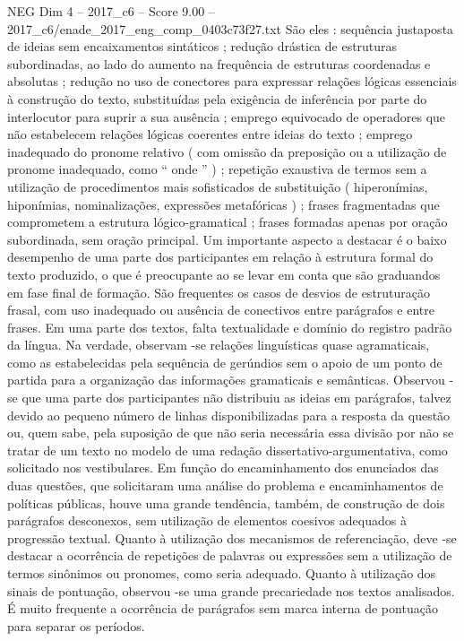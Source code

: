 \begin{textsample}{NEG Dim 4 – 2017\_c6 – Score 9.00 – 2017\_c6/enade\_2017\_eng\_comp\_0403c73f27.txt}
São eles : sequência justaposta de ideias sem encaixamentos sintáticos ; redução drástica de estruturas subordinadas, ao lado do aumento na frequência de estruturas coordenadas e absolutas ; redução no uso de conectores para expressar relações lógicas essenciais à construção do texto, substituídas pela exigência de inferência por parte do interlocutor para suprir a sua ausência ; emprego equivocado de operadores que não estabelecem relações lógicas coerentes entre ideias do texto ; emprego inadequado do pronome relativo ( com omissão da preposição ou a utilização de pronome inadequado, como “ onde ” ) ; repetição exaustiva de termos sem a utilização de procedimentos mais sofisticados de substituição ( hiperonímias, hiponímias, nominalizações, expressões metafóricas ) ; frases fragmentadas que comprometem a estrutura lógico-gramatical ; frases formadas apenas por oração subordinada, sem oração principal.
Um importante aspecto a destacar é o baixo desempenho de uma parte dos participantes em relação à estrutura formal do texto produzido, o que é preocupante ao se levar em conta que são graduandos em fase final de formação.
São frequentes os casos de desvios de estruturação frasal, com uso inadequado ou ausência de conectivos entre parágrafos e entre frases.
Em uma parte dos textos, falta textualidade e domínio do registro padrão da língua.
Na verdade, observam -se relações linguísticas quase agramaticais, como as estabelecidas pela sequência de gerúndios sem o apoio de um ponto de partida para a organização das informações gramaticais e semânticas.
Observou -se que uma parte dos participantes não distribuiu as ideias em parágrafos, talvez devido ao pequeno número de linhas disponibilizadas para a resposta da questão ou, quem sabe, pela suposição de que não seria necessária essa divisão por não se tratar de um texto no modelo de uma redação dissertativo-argumentativa, como solicitado nos vestibulares.
Em função do encaminhamento dos enunciados das duas questões, que solicitaram uma análise do problema e encaminhamentos de políticas públicas, houve uma grande tendência, também, de construção de dois parágrafos desconexos, sem utilização de elementos coesivos adequados à progressão textual.
Quanto à utilização dos mecanismos de referenciação, deve -se destacar a ocorrência de repetições de palavras ou expressões sem a utilização de termos sinônimos ou pronomes, como seria adequado.
Quanto à utilização dos sinais de pontuação, observou -se uma grande precariedade nos textos analisados.
É muito frequente a ocorrência de parágrafos sem marca interna de pontuação para separar os períodos.

\end{textsample}
